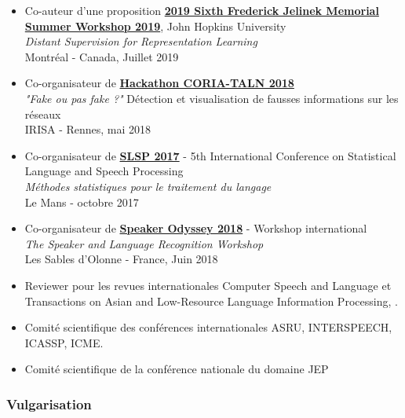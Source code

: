 \documentclass[11pt,a4paper]{article}
\begin{document}
\begin{itemize} 
	
\item Co-auteur d'une proposition \href{https://www.clsp.jhu.edu/workshops/19-workshop/distant-supervision-for-representation-learning-in-speech-and-handwriting/}{\textbf{2019 Sixth Frederick Jelinek Memorial Summer Workshop 2019}}, John Hopkins University\\
\textit{Distant Supervision for Representation Learning} \\
Montréal - Canada, Juillet 2019 %

\item Co-organisateur de \href{https://hackatal.github.io/2018/}{\textbf{Hackathon CORIA-TALN 2018}} \\
\textit{"Fake ou pas fake ?"} Détection et visualisation de fausses informations sur les réseaux \\
IRISA - Rennes, mai 2018 %

\item Co-organisateur de \href{https://lium.univ-lemans.fr/slsp-2017/}{\textbf{SLSP 2017}} - 5th International Conference on Statistical Language and Speech Processing\\
\textit{Méthodes statistiques pour le traitement du langage} \\
Le Mans - octobre 2017 %

\item Co-organisateur de \href{http://www.odyssey2018.org/}{\textbf{Speaker Odyssey 2018}} - Workshop international \\
\textit{The Speaker and Language Recognition Workshop} \\
Les Sables d'Olonne - France, Juin 2018

\item Reviewer pour les revues internationales Computer Speech and Language et Transactions on Asian and Low-Resource Language Information Processing, .

\item Comité scientifique des conférences internationales  ASRU, INTERSPEECH, ICASSP, ICME.
\item Comité scientifique de la conférence nationale du domaine JEP

\end{itemize}

\subsubsection{Vulgarisation}
\end{document}
